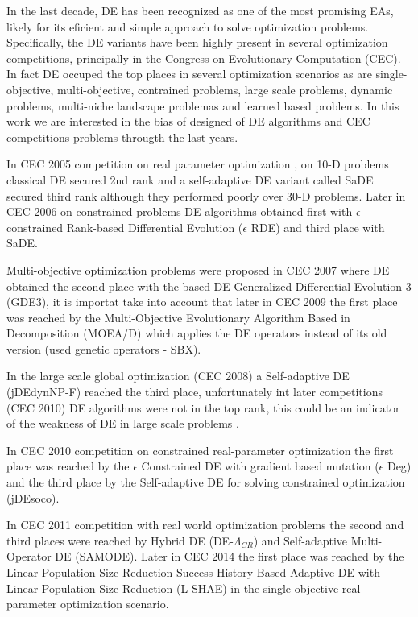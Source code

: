 In the last decade, DE has been recognized as one of the most promising EAs, likely for its eficient and simple approach to solve optimization problems.
%
Specifically, the DE variants have been highly present in several optimization competitions, principally in the Congress on Evolutionary Computation (CEC).
%
In fact DE occuped the top places in several optimization scenarios as are single-objective, multi-objective, contrained problems, large scale problems, dynamic problems, multi-niche landscape problemas and learned based problems.
%
In this work we are interested in the bias of designed of DE algorithms and CEC competitions problems througth the last years.
%

In CEC 2005 competition on real parameter optimization \cite{CEC2005}, on 10-D problems classical DE secured 2nd rank and a self-adaptive DE variant called SaDE secured third rank although they performed poorly over 30-D problems.
%
Later in CEC 2006 on constrained problems \cite{CEC2006} DE algorithms obtained first with $\epsilon$ constrained Rank-based Differential Evolution ($\epsilon$ RDE) and third place with SaDE.
%

Multi-objective optimization problems were proposed in CEC 2007 \cite{CEC2007} where DE obtained the second place with the based DE Generalized Differential Evolution 3 (GDE3), it is importat take into account that later in CEC 2009 the first place was reached by the Multi-Objective Evolutionary Algorithm Based in Decomposition (MOEA/D) which applies the DE operators instead of its old version (used genetic operators - SBX).

%
In the large scale global optimization (CEC 2008) \cite{CEC2008} a Self-adaptive DE (jDEdynNP-F) reached the third place, unfortunately int later competitions (CEC 2010) DE algorithms were not in the top rank, this could be an indicator of the weakness of DE in large scale problems \cite{segura2015improving}.

In CEC 2010 competition on constrained real-parameter optimization \cite{CEC2010} the first place was reached by the $\epsilon$ Constrained DE with gradient based mutation ($\epsilon$ Deg) and the third place by the Self-adaptive DE for solving constrained optimization (jDEsoco).

In CEC 2011 competition with real world optimization problems the second and third places were reached by Hybrid DE (DE-$\Lambda_{CR}$) and Self-adaptive Multi-Operator DE (SAMODE).
%
%
Later in CEC 2014 the first place was reached by the Linear Population Size Reduction Success-History Based Adaptive DE with Linear Population Size Reduction (L-SHAE) in the single objective real parameter optimization scenario.
%



